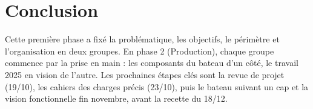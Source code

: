 \section{Conclusion}
\label{sec:conclusion}

Cette première phase a fixé la problématique, les objectifs, le périmètre et l'organisation en deux groupes. En phase 2 (Production), chaque groupe commence par la prise en main : les composants du bateau d'un côté, le travail 2025 en vision de l'autre. Les prochaines étapes clés sont la revue de projet (19/10), les cahiers des charges précis (23/10), puis le bateau suivant un cap et la vision fonctionnelle fin novembre, avant la recette du 18/12.


